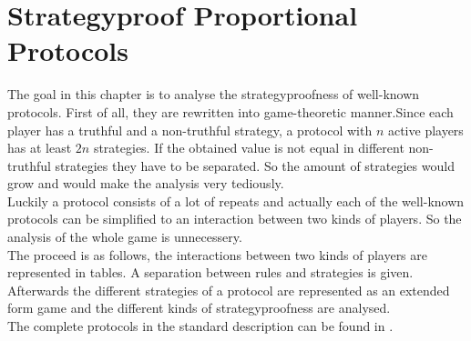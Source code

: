 \section{Strategyproof Proportional Protocols}
The goal in this chapter is to analyse the strategyproofness of well-known protocols. First of all, they are rewritten into game-theoretic manner.Since each player has a truthful and a non-truthful strategy, a protocol with $n$ active players has at least $2n$ strategies. If the obtained value is not equal in different non-truthful strategies they have to be separated. So the amount of strategies would grow and would make the analysis very tediously.\\Luckily a protocol consists of a lot of repeats and actually each of the well-known protocols can be simplified to an interaction between two kinds of players. So the analysis of the whole game is unnecessery.\\
The proceed is as follows, the interactions between two kinds of players are represented in tables. A separation between rules and strategies is given. Afterwards the different strategies of a protocol are represented as an extended form game and the different kinds of strategyproofness are analysed.
\\The complete protocols in the standard description can be found in \cite{robertson:cake-cutting}.
